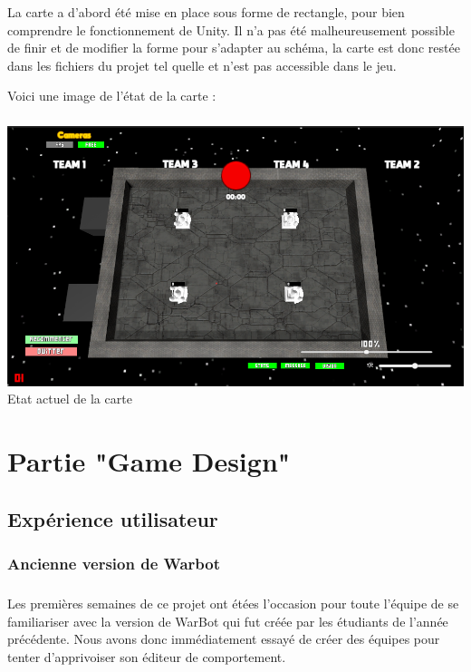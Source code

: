 \documentclass{report}
\begin{document}
La carte a d'abord été mise en place sous forme de rectangle, pour bien comprendre le fonctionnement de Unity. Il  n’a pas été malheureusement possible de finir et de modifier la forme pour s’adapter au schéma, la carte est donc restée dans les fichiers du projet tel quelle et n’est pas accessible dans le jeu.

Voici une image de l’état de la carte : 

\paragraph{}
\begin{center}
\includegraphics[scale=0.5]{DATA/space.png}
 {Etat actuel de la carte}
\end{center}
\paragraph{}



\newpage
\chapter{Partie "Game Design"}
\section{Expérience utilisateur}
\subsection{Ancienne version de Warbot}
\paragraph{}
    Les premières semaines de ce projet ont étées l’occasion pour toute l’équipe de se familiariser avec la version de WarBot qui fut créée par les étudiants de l’année précédente. Nous avons donc immédiatement essayé de créer des équipes pour tenter d’apprivoiser son éditeur de comportement.
\end{document}

